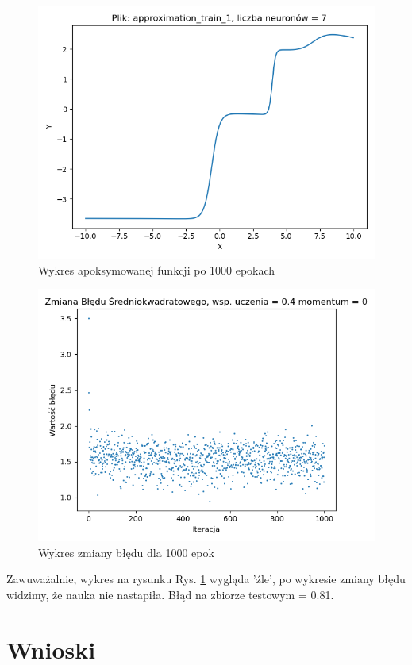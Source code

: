\documentclass[12pt]{article}
\begin{document}
\begin{figure}[!htb]
 \centering
 \includegraphics[width=12cm]{FunctionPlot7Neuronucz05.png}
 \caption{Wykres apoksymowanej funkcji po 1000 epokach}
 \vspace{-0.3cm}
 \label{WykresFun12}
\end{figure}

\begin{figure}[!htb]
 \centering
 \includegraphics[width=12cm]{ZmianaBledu7Neuronucz05.png}
 \vspace{-0.3cm}
 \caption{Wykres zmiany błędu dla 1000 epok}
 \label{WykresBlad12}
\end{figure}
\newpage
Zawuważalnie, wykres na rysunku Rys. \ref{WykresFun12} wygląda 'źle', po wykresie zmiany błędu widzimy, że nauka nie nastapiła.
Błąd na zbiorze testowym = 0.81.
\newpage
\section{Wnioski}
\end{document}
